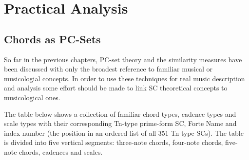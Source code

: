 \documentclass{article}
\begin{document}
\section{Practical Analysis}
\label{sec-7}
\subsection{Chords as PC-Sets}
\label{sec-7-1}

So far in the previous chapters, PC-set theory and the similarity
measures have been discussed with only the broadest reference to
familiar musical or musicologial concepts. In order to use these
techniques for real music description and analysis some effort should
be made to link SC theoretical concepts to musicological ones.

The table below shows a collection of familiar chord types, cadence
types and scale types with their corresponding Tn-type prime-form SC,
Forte Name and index number (the position in an ordered list of all
351 Tn-type SCs). The table is divided into five vertical segments:
three-note chords, four-note chords, five-note chords, cadences and
scales.
\end{document}

